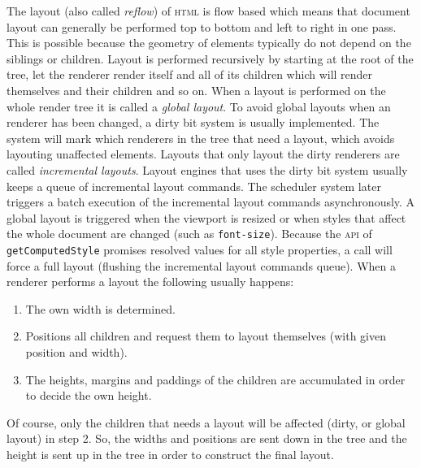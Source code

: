 \documentclass[a4paper,11pt]{kth-mag}
\newcommand{\code}[1]{\texttt{#1}}
\begin{document}
        The layout (also called \emph{reflow}) of \textsc{html} is flow based which means that document layout can generally be performed top to bottom and left to right in one pass.
        This is possible because the geometry of elements typically do not depend on the siblings or children.
        Layout is performed recursively by starting at the root of the tree, let the renderer render itself and all of its children which will render themselves and their children and so on.
        When a layout is performed on the whole render tree it is called a \emph{global layout}.
        To avoid global layouts when an renderer has been changed, a dirty bit system is usually implemented.
        The system will mark which renderers in the tree that need a layout, which avoids layouting unaffected elements.
        Layouts that only layout the dirty renderers are called \emph{incremental layouts}.
        Layout engines that uses the dirty bit system usually keeps a queue of incremental layout commands.
        The scheduler system later triggers a batch execution of the incremental layout commands asynchronously.
        A global layout is triggered when the viewport is resized or when styles that affect the whole document are changed (such as \code{font-size}).
        Because the \textsc{api} of \code{getComputedStyle} promises resolved values for all style properties, a call will force a full layout (flushing the incremental layout commands queue).
        When a renderer performs a layout the following usually happens:
        \begin{enumerate}
          \item The own width is determined.
          \item Positions all children and request them to layout themselves (with given position and width).
          \item The heights, margins and paddings of the children are accumulated in order to decide the own height.
        \end{enumerate}
        Of course, only the children that needs a layout will be affected (dirty, or global layout) in step 2.
        So, the widths and positions are sent down in the tree and the height is sent up in the tree in order to construct the final layout.
\end{document}
